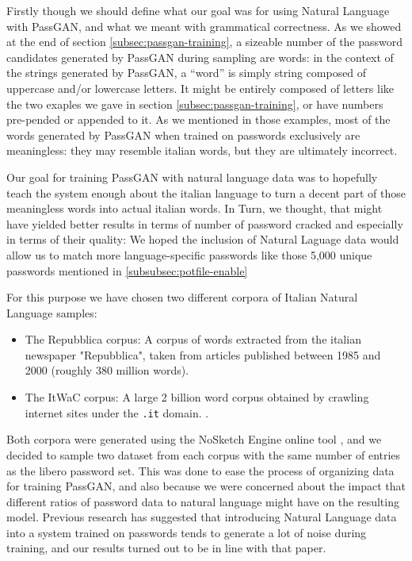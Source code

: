 Firstly though we should define what our goal was for using Natural Language with PassGAN, and what we meant with grammatical correctness. 
As we showed at the end of section \ref{subsec:passgan-training}, a sizeable number of the password candidates generated by PassGAN during sampling are words: in the context of the strings generated by PassGAN, a \enquote{word} is simply string composed of uppercase and/or lowercase letters. It might be entirely composed of letters like the two exaples we gave in section \ref{subsec:passgan-training}, or have numbers pre-pended or appended to it. As we mentioned in those examples, most of the words generated by PassGAN when trained on passwords exclusively are meaningless: they may resemble italian words, but they are ultimately incorrect.

Our goal for training PassGAN with natural language data was to hopefully teach the system enough about the italian language to turn a decent part of those meaningless words into actual italian words. In Turn, we thought, that might have yielded better results in terms of number of password cracked and especially in terms of their quality: We hoped the inclusion of Natural Laguage data would allow us to match more language-specific passwords like those 5,000 unique passwords mentioned in \ref{subsubsec:potfile-enable}   

For this purpose we have chosen two different corpora of Italian Natural Language samples: 
\begin{itemize}
    \item The Repubblica corpus: A corpus of words extracted from the italian newspaper "Repubblica", taken from articles published between 1985 and 2000 (roughly 380 million words).\cite{repubblica_corpus}
    \item The ItWaC corpus: A large 2 billion word corpus obtained by crawling internet sites under the \texttt{.it} domain. \cite{itwac_corpus}.  
\end{itemize}
Both corpora were generated using the NoSketch Engine online tool \cite{nosketch_engine}, and we decided to sample two dataset from each corpus with the same number of entries as the libero password set. This was done to ease the process of organizing data for training PassGAN, and also because we were concerned about the impact that different ratios of password data to natural language might have on the resulting model.
Previous research \cite{Melicher2016} has suggested that introducing Natural Language data into a system trained on passwords tends to generate a lot of noise during training, and our results turned out to be in line with that paper.

